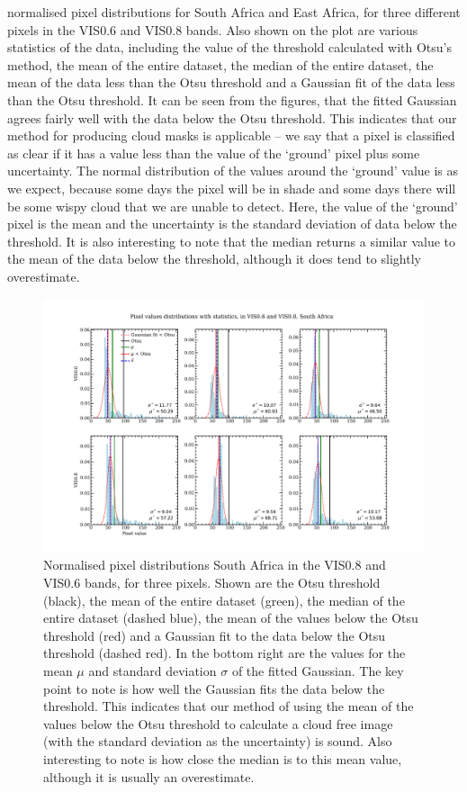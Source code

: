 normalised pixel distributions for South Africa and East Africa, for
three different pixels in the VIS0.6 and VIS0.8 bands. Also shown on
the plot are various statistics of the data, including the value of
the threshold calculated with Otsu's method, the mean of the entire
dataset, the median of the entire dataset, the mean of the data less
than the Otsu threshold and a Gaussian fit of the data less than the
Otsu threshold. It can be seen from the figures, that the fitted
Gaussian agrees fairly well with the data below the Otsu
threshold. This indicates that our method for producing cloud masks is
applicable -- we say that a pixel is classified as clear if it has a
value less than the value of the `ground' pixel plus some
uncertainty. The normal distribution of the values around the `ground'
value is as we expect, because some days the pixel will be in shade
and some days there will be some wispy cloud that we are unable to
detect. Here, the value of the `ground' pixel is the mean and the
uncertainty is the standard deviation of data below the threshold. It
is also interesting to note that the median returns a similar value to
the mean of the data below the threshold, although it does tend to
slightly overestimate.
\begin{figure}
  \centering
  \includegraphics[width=\textwidth]{figures/pixel_distributions_stats_capetown}
  \caption{Normalised pixel distributions South Africa in the VIS0.8
    and VIS0.6 bands, for three pixels. Shown are the Otsu threshold
    (black), the mean of the entire dataset (green), the median of the
    entire dataset (dashed blue), the mean of the values below the
    Otsu threshold (red) and a Gaussian fit to the data below the Otsu
    threshold (dashed red). In the bottom right are the values for the
    mean $\mu$ and standard deviation $\sigma$ of the fitted Gaussian. The
    key point to note is how well the Gaussian fits the data below the
    threshold. This indicates that our method of using the mean of the
    values below the Otsu threshold to calculate a cloud free image
    (with the standard deviation as the uncertainty) is sound. Also
    interesting to note is how close the median is to this mean value,
    although it is usually an overestimate.}
  \label{fig:pix_d_south}
\end{figure}

